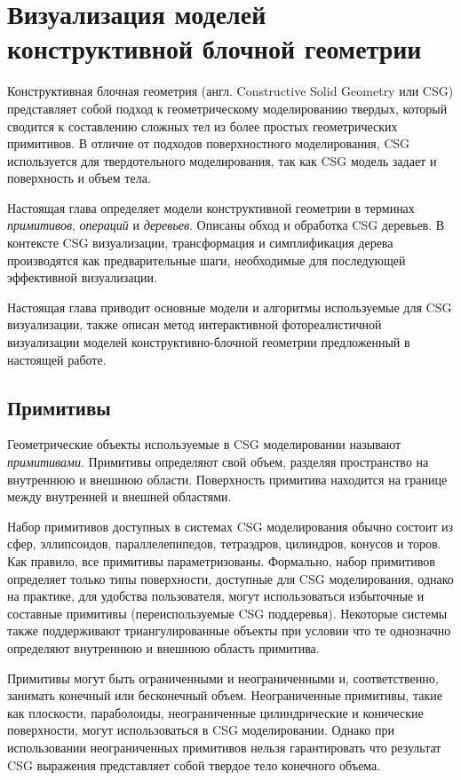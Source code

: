\chapter{Визуализация моделей конструктивной блочной геометрии} \label{chapt2}

Конструктивная блочная геометрия (англ. Constructive Solid Geometry или CSG) \cite{Requicha80} представляет собой подход к геометрическому моделированию твердых, который сводится к составлению сложных тел из более простых геометрических примитивов. В отличие от подходов поверхностного моделирования, CSG используется для твердотельного моделирования, так как CSG модель задает и поверхность и объем тела.

Настоящая глава определяет модели конструктивной геометрии в терминах \textit{примитивов}, \textit{операций} и \textit{деревьев}. Описаны обход и обработка CSG деревьев. В контексте CSG визуализации, трансформация и симплификация дерева производятся как предварительные шаги, необходимые для последующей эффективной визуализации.

Настоящая глава приводит основные модели и алгоритмы используемые для CSG визуализации, также описан метод интерактивной фотореалистичной визуализации моделей конструктивно-блочной геометрии предложенный в настоящей работе.

\section{Примитивы} \label{sect_primitives}

Геометрические объекты используемые в CSG моделировании называют \textit{примитивами}. Примитивы определяют свой объем, разделяя пространство на внутреннюю и внешнюю области. Поверхность примитива находится на границе между внутренней и внешней областями.

Набор примитивов доступных в системах CSG моделирования обычно состоит из сфер, эллипсоидов, параллелепипедов, тетраэдров, цилиндров, конусов и торов. Как правило, все примитивы параметризованы. Формально, набор примитивов определяет только типы поверхности, доступные для CSG моделирования, однако на практике, для удобства пользователя, могут использоваться избыточные и составные примитивы (переиспользуемые CSG поддеревья). Некоторые системы также поддерживают триангулированные объекты при условии что те однозначно определяют внутреннюю и внешнюю область примитива.

Примитивы могут быть ограниченными и неограниченными и, соответственно, занимать конечный или бесконечный объем. Неограниченные примитивы, такие как плоскости, параболоиды, неограниченные цилиндрические и конические поверхности, могут использоваться в CSG моделировании. Однако при использовании неограниченных примитивов нельзя гарантировать что результат CSG выражения представляет собой твердое тело конечного объема.

